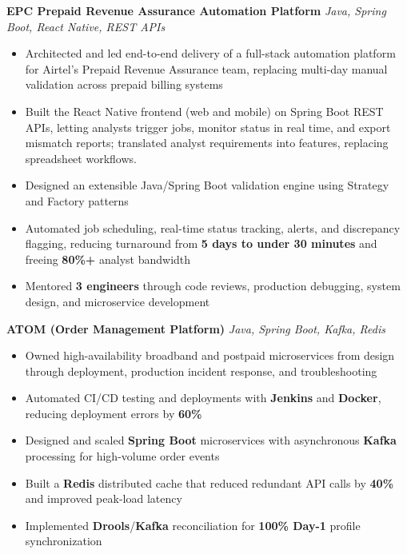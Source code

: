 \documentclass[letterpaper,11pt]{article}
\newcommand{\resumeItem}[1]{
  \item\small{{#1 \vspace{-2pt}}}
}
\newcommand{\resumeItemListStart}{\begin{itemize}}
\newcommand{\resumeItemListEnd}{\end{itemize}\vspace{-5pt}}
\begin{document}
      \vspace{4pt}
      \vspace{4pt}
      \textbf{\small EPC Prepaid Revenue Assurance Automation Platform} \hfill \textit{\small Java, Spring Boot, React Native, REST APIs} \\
      \vspace{-2pt}
      \resumeItemListStart
        \resumeItem{Architected and led end-to-end delivery of a full-stack automation platform for Airtel's Prepaid Revenue Assurance team, replacing multi-day manual validation across prepaid billing systems}
        \resumeItem{Built the React Native frontend (web and mobile) on Spring Boot REST APIs, letting analysts trigger jobs, monitor status in real time, and export mismatch reports; translated analyst requirements into features, replacing spreadsheet workflows.} %
        \resumeItem{Designed an extensible Java/Spring Boot validation engine using Strategy and Factory patterns}
        \resumeItem{Automated job scheduling, real-time status tracking, alerts, and discrepancy flagging, reducing turnaround from \textbf{5 days to under 30 minutes} and freeing \textbf{80\%+} analyst bandwidth}
        \resumeItem{Mentored \textbf{3 engineers} through code reviews, production debugging, system design, and microservice development}
      \resumeItemListEnd

      \vspace{4pt}
      \textbf{\small ATOM (Order Management Platform)} \hfill \textit{\small Java, Spring Boot, Kafka, Redis} \\
      \vspace{-2pt}
      \resumeItemListStart
        \resumeItem{Owned high-availability broadband and postpaid microservices from design through deployment, production incident response, and troubleshooting}
        \resumeItem{Automated CI/CD testing and deployments with \textbf{Jenkins} and \textbf{Docker}, reducing deployment errors by \textbf{60\%}}
        \resumeItem{Designed and scaled \textbf{Spring Boot} microservices with asynchronous \textbf{Kafka} processing for high-volume order events}
        \resumeItem{Built a \textbf{Redis} distributed cache that reduced redundant API calls by \textbf{40\%} and improved peak-load latency}
        \resumeItem{Implemented \textbf{Drools}/\textbf{Kafka} reconciliation for \textbf{100\% Day-1} profile synchronization}
      \resumeItemListEnd
\end{document}

